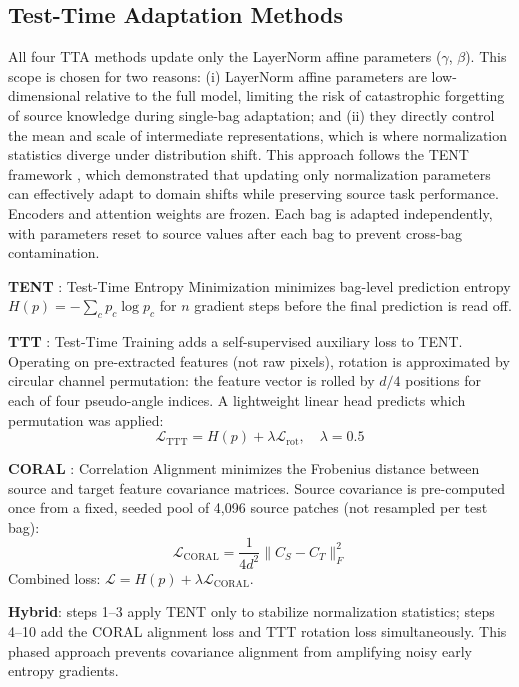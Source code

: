 \documentclass[conference]{IEEEtran}
\begin{document}
\subsection{Test-Time Adaptation Methods}

All four TTA methods update only the LayerNorm affine parameters ($\gamma$, $\beta$). This scope is chosen for two reasons: (i) LayerNorm affine parameters are low-dimensional relative to the full model, limiting the risk of catastrophic forgetting of source knowledge during single-bag adaptation; and (ii) they directly control the mean and scale of intermediate representations, which is where normalization statistics diverge under distribution shift. This approach follows the TENT framework \cite{wang2021tent}, which demonstrated that updating only normalization parameters can effectively adapt to domain shifts while preserving source task performance. Encoders and attention weights are frozen. Each bag is adapted independently, with parameters reset to source values after each bag to prevent cross-bag contamination.

\textbf{TENT} \cite{wang2021tent}: Test-Time Entropy Minimization minimizes bag-level prediction entropy $H(p) = -\sum_c p_c \log p_c$ for $n$ gradient steps before the final prediction is read off.

\textbf{TTT} \cite{sun2020test}: Test-Time Training adds a self-supervised auxiliary loss to TENT. Operating on pre-extracted features (not raw pixels), rotation is approximated by circular channel permutation: the feature vector is rolled by $d/4$ positions for each of four pseudo-angle indices. A lightweight linear head predicts which permutation was applied:
\begin{equation}
\mathcal{L}_{\text{TTT}} = H(p) + \lambda \mathcal{L}_{\text{rot}}, \quad \lambda = 0.5
\end{equation}

\textbf{CORAL} \cite{sun2016coral}: Correlation Alignment minimizes the Frobenius distance between source and target feature covariance matrices. Source covariance is pre-computed once from a fixed, seeded pool of 4,096 source patches (not resampled per test bag):
\begin{equation}
\mathcal{L}_{\text{CORAL}} = \frac{1}{4d^2} \| C_S - C_T \|_F^2
\end{equation}
Combined loss: $\mathcal{L} = H(p) + \lambda \mathcal{L}_{\text{CORAL}}$.

\textbf{Hybrid}: steps 1--3 apply TENT only to stabilize normalization statistics; steps 4--10 add the CORAL alignment loss and TTT rotation loss simultaneously. This phased approach prevents covariance alignment from amplifying noisy early entropy gradients.
\end{document}

